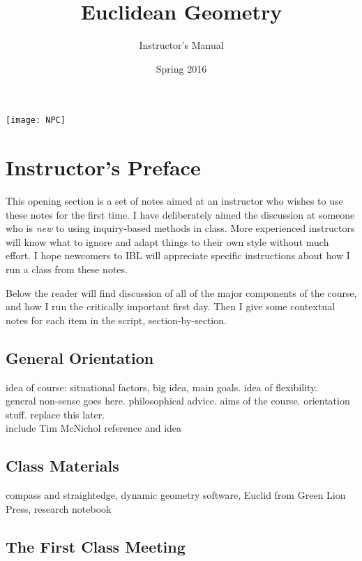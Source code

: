 \documentclass{tufte-handout}
\title{Euclidean Geometry}
\author[Instructor's Manual]{Instructor's Manual}
\date{Spring 2016}
\theoremstyle{definition}
\begin{document}
\maketitle

\begin{marginfigure}
    \texttt{[image: NPC]}
\end{marginfigure}


\setcounter{section}{0}
\section{Instructor's Preface}

This opening section is a set of notes aimed at an instructor who wishes to use these notes for the first time.
I have deliberately aimed the discussion at someone who is \emph{new} to using inquiry-based methods in class.
More experienced instructors will know what to ignore and adapt things to their own style without much effort.
I hope newcomers to IBL will appreciate specific instructions about how I run a class from these notes.

Below the reader will find discussion of all of the major components of the course, and how I run the critically important first day.
Then I give some contextual notes for each item in the script, section-by-section.

\subsection{General Orientation}

idea of course: situational factors, big idea, main goals. idea of flexibility.\\

general non-sense goes here. philosophical advice. aims of the course. orientation stuff.  replace this later.\\

include Tim McNichol reference and idea

\subsection{Class Materials}

compass and straightedge, dynamic geometry software, Euclid from Green Lion Press, 
research notebook


\subsection{The First Class Meeting}
\end{document}
